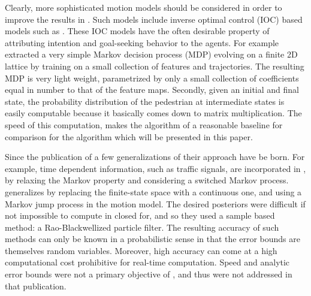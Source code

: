 \documentclass[conference]{IEEEtran}
\begin{document}
Clearly, more sophisticated motion models should be considered in order to improve the results in \cite{Schneider2013}.
Such models include inverse optimal control (IOC) based models such as \cite{Ziebart2008,Ziebart2009,Kitani2012,Karasev2016}.
These IOC models have the often desirable property of attributing intention and goal-seeking behavior to the agents.
For example \citet{Kitani2012} extracted a very simple Markov decision process (MDP) evolving on a finite 2D lattice by training on a small collection of features and trajectories.
The resulting MDP is very light weight, parametrized by only a small collection of coefficients equal in number to that of the feature maps.
Secondly, given an initial and final state, the probability distribution of the pedestrian at intermediate states is easily computable because it basically comes down to matrix multiplication.
The speed of this computation, makes the algorithm of \cite{Kitani2012} a reasonable baseline for comparison for the algorithm which will be presented in this paper.

Since the publication of \cite{Kitani2012} a few generalizations of their approach have be born.
For example, time dependent information, such as traffic signals, are incorporated in \cite{Karasev2016}, by relaxing the Markov property and considering a switched Markov process.
\citet{Karasev2016} generalizes \cite{Kitani2012} by replacing the finite-state space with a continuous one, and using a Markov jump process in the motion model.
The desired posteriors were difficult if not impossible to compute in closed for, and so they used a sample based method: a Rao-Blackwellized particle filter\cite{Doucet2000}.
The resulting accuracy of such methods can only be known in a probabilistic sense in that the error bounds are themselves random variables.
Moreover, high accuracy can come at a high computational cost prohibitive for real-time computation.
Speed and analytic error bounds were not a primary objective of \cite{Karasev2016}, and thus were not addressed in that publication.
\end{document}
